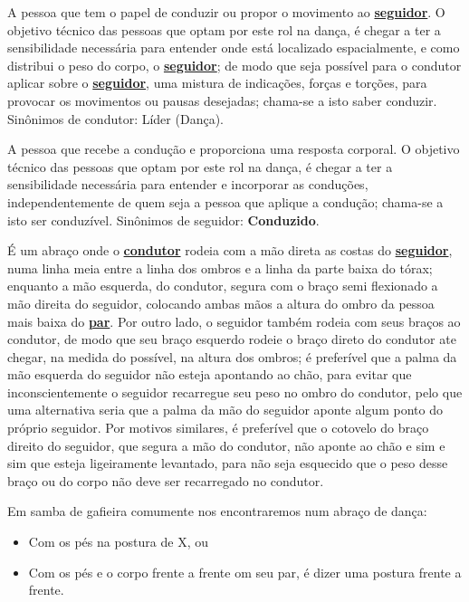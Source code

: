 \begin{definition} 
\label{def:Condutor} 
A pessoa que tem o papel de conduzir ou propor o movimento ao \hyperref[def:Seguidor]{\textbf{seguidor}}. 
O objetivo técnico das pessoas que optam por este rol na dança, é chegar 
a ter a sensibilidade necessária para entender onde está localizado espacialmente, 
e como distribui o peso do corpo, o \hyperref[def:Seguidor]{\textbf{seguidor}}; 
de modo que seja possível para o condutor aplicar sobre o \hyperref[def:Seguidor]{\textbf{seguidor}}, 
uma mistura de indicações, forças e torções,  
para provocar os movimentos ou pausas desejadas;
chama-se a isto saber conduzir.
Sinônimos de condutor: Líder (Dança).
\end{definition}

\begin{definition} 
\label{def:Seguidor} 
A pessoa que recebe a condução e proporciona uma resposta corporal. 
O objetivo técnico das pessoas que optam por este rol na dança, é chegar 
a ter a sensibilidade necessária para entender e incorporar as conduções,
independentemente de quem seja a pessoa que aplique a condução;
chama-se a isto ser conduzível.
Sinônimos de seguidor: \textbf{Conduzido}.
\end{definition}


\begin{definition}
\label{def:abracodedanca}  
É um abraço onde o \hyperref[def:Condutor]{\textbf{condutor}} 
rodeia com a mão direta as costas do \hyperref[def:Seguidor]{\textbf{seguidor}},
numa linha meia entre a linha dos ombros e a linha da parte baixa do tórax;
enquanto a mão esquerda, do condutor, segura com o braço semi flexionado a mão direita do seguidor,
colocando ambas mãos a altura do ombro da pessoa mais baixa do \hyperref[def:Par]{\textbf{par}}.
Por outro lado, o seguidor também rodeia com seus braços ao condutor,
de modo que seu braço esquerdo rodeie o braço direto do condutor ate chegar,
na medida do possível, na altura dos ombros; 
é preferível que a palma da mão esquerda do seguidor não esteja apontando ao chão,
para evitar que inconscientemente o seguidor recarregue seu peso no ombro do condutor,
pelo que uma alternativa seria que a palma da mão do seguidor aponte algum ponto do próprio seguidor.
Por motivos similares, é preferível que o cotovelo do braço direito do seguidor,
que segura a mão do condutor,
não aponte ao chão e sim e sim que esteja ligeiramente levantado,
para não seja esquecido que o peso desse braço ou do corpo não deve ser recarregado no condutor. 



Em samba de gafieira comumente nos encontraremos num abraço de dança:
\begin{itemize}
\item Com os pés na postura de X, ou
\item Com os pés e o corpo frente a frente om seu par, é dizer uma postura frente a frente.
\end{itemize}
\end{definition}


